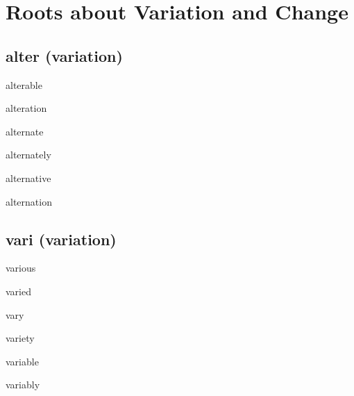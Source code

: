 \chapter{Roots about Variation and Change}

\section{alter (variation)}

\begin{RefWord}{alterable}
\end{RefWord}

\begin{RefWord}{alteration}
\end{RefWord}

\begin{RefWord}{alternate}
\end{RefWord}

\begin{RefWord}{alternately}
\end{RefWord}

\begin{RefWord}{alternative}
\end{RefWord}

\begin{RefWord}{alternation}
\end{RefWord}

\section{vari (variation)}

\begin{RefWord}{various}
\end{RefWord}

\begin{RefWord}{varied}
\end{RefWord}

\begin{RefWord}{vary}
\end{RefWord}

\begin{RefWord}{variety}
\end{RefWord}

\begin{RefWord}{variable}
\end{RefWord}

\begin{RefWord}{variably}
\end{RefWord}

